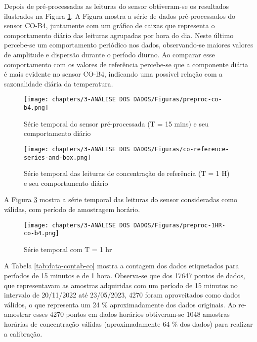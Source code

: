 Depois de pré-processadas as leituras do sensor obtiveram-se os resultados ilustrados na Figura \ref{fig:data-co-preproc-15}. A Figura mostra a série de dados pré-processados do sensor CO-B4, juntamente com um gráfico de caixas que representa o comportamento diário das leituras agrupadas por hora do dia. Neste último percebe-se um comportamento periódico nos dados, observando-se maiores valores de amplitude e dispersão durante o período diurno. Ao comparar esse comportamento com os valores de referência percebe-se que a componente diária é mais evidente no sensor CO-B4, indicando uma possível relação com a sazonalidade diária da temperatura.

\begin{figure}[h]
    \centering
    \caption{Série temporal do sensor pré-processada (T = 15 mins) e seu comportamento diário}
    \texttt{[image: chapters/3-ANÁLISE DOS DADOS/Figuras/preproc-co-b4.png]}
    \label{fig:data-co-preproc-15}
\end{figure}

\begin{figure}[h]
    \centering
    \caption{Série temporal das leituras de concentração de referência (T = 1 H) e seu comportamento diário}
    \texttt{[image: chapters/3-ANÁLISE DOS DADOS/Figuras/co-reference-series-and-box.png]}
    \label{fig:data-co-reference}
\end{figure}

A Figura \ref{fig:data-co-preproc-1HR} mostra a série temporal das leituras do sensor consideradas como válidas, com período de amostragem horário.

\begin{figure}[h]
    \centering
    \caption{Série temporal com T = 1 hr}
    \texttt{[image: chapters/3-ANÁLISE DOS DADOS/Figuras/preproc-1HR-co-b4.png]}
    \label{fig:data-co-preproc-1HR}
\end{figure}

A Tabela \ref{tab:data-contab-co} mostra a contagem dos dados etiquetados para períodos de 15 minutos e de 1 hora. Observa-se que dos 17647 pontos de dados, que representavam as amostras adquiridas com um período de 15 minutos no intervalo de 20/11/2022 até 23/05/2023, 4270 foram aproveitados como dados válidos, o que representa um 24 \% aproximadamente dos dados originais. Ao re-amostrar esses 4270 pontos em dados horários obtiveram-se 1048 amostras horárias de concentração válidas (aproximadamente 64 \% dos dados) para realizar a calibração.

